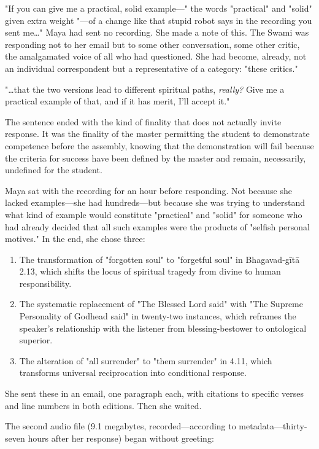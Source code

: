\documentclass[12pt,twoside]{book}
\begin{document}
"If you can give me a practical, solid example—" the words "practical" and "solid" given extra weight "—of a change like that stupid robot says in the recording you sent me\ldots{}" Maya had sent no recording. She made a note of this. The Swami was responding not to her email but to some other conversation, some other critic, the amalgamated voice of all who had questioned. She had become, already, not an individual correspondent but a representative of a category: "these critics."

"\ldots{}that the two versions lead to different spiritual paths, \emph{really?} Give me a practical example of that, and if it has merit, I'll accept it."

The sentence ended with the kind of finality that does not actually invite response. It was the finality of the master permitting the student to demonstrate competence before the assembly, knowing that the demonstration will fail because the criteria for success have been defined by the master and remain, necessarily, undefined for the student.

Maya sat with the recording for an hour before responding. Not because she lacked examples—she had hundreds—but because she was trying to understand what kind of example would constitute "practical" and "solid" for someone who had already decided that all such examples were the products of "selfish personal motives." In the end, she chose three:

\begin{enumerate}
\item The transformation of "forgotten soul" to "forgetful soul" in Bhagavad-gītā 2.13, which shifts the locus of spiritual tragedy from divine to human responsibility.

\item The systematic replacement of "The Blessed Lord said" with "The Supreme Personality of Godhead said" in twenty-two instances, which reframes the speaker's relationship with the listener from blessing-bestower to ontological superior.

\item The alteration of "all surrender" to "them surrender" in 4.11, which transforms universal reciprocation into conditional response.
\end{enumerate}

She sent these in an email, one paragraph each, with citations to specific verses and line numbers in both editions. Then she waited.

The second audio file (9.1 megabytes, recorded—according to metadata—thirty-seven hours after her response) began without greeting:
\end{document}
